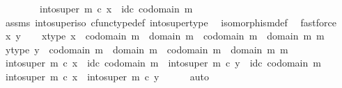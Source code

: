 \begin{isabellebody}
\ \ \ \ \ \ \ \ into{\isacharunderscore}{\kern0pt}super\ m\ {\isasymcirc}\isactrlsub c\ x\ {\isacharequal}{\kern0pt}\ id\isactrlsub c\ {\isacharparenleft}{\kern0pt}codomain\ m{\isacharparenright}{\kern0pt}{\isachardoublequoteclose}\isanewline
\ \ \ \ \isamarkupfalse%
\ assms\ into{\isacharunderscore}{\kern0pt}super{\isacharunderscore}{\kern0pt}iso\ cfunc{\isacharunderscore}{\kern0pt}type{\isacharunderscore}{\kern0pt}def\ into{\isacharunderscore}{\kern0pt}super{\isacharunderscore}{\kern0pt}type\ \isamarkupfalse%
\ isomorphism{\isacharunderscore}{\kern0pt}def\ \isamarkupfalse%
\ fastforce\isanewline
{}\isamarkupfalse%
\isanewline
\ \ \isamarkupfalse%
\ x\ y\isanewline
\ \ \isamarkupfalse%
\ x{\isacharunderscore}{\kern0pt}type{\isacharcolon}{\kern0pt}\ {\isachardoublequoteopen}x\ {\isacharcolon}{\kern0pt}\ codomain\ m\ {\isasymrightarrow}\ domain\ m\ {\isasymCoprod}\ {\isacharparenleft}{\kern0pt}codomain\ m\ {\isasymsetminus}\ {\isacharparenleft}{\kern0pt}domain\ m{\isacharcomma}{\kern0pt}\ m{\isacharparenright}{\kern0pt}{\isacharparenright}{\kern0pt}{\isachardoublequoteclose}\isanewline
\ \ \isamarkupfalse%
\ y{\isacharunderscore}{\kern0pt}type{\isacharcolon}{\kern0pt}\ {\isachardoublequoteopen}y\ {\isacharcolon}{\kern0pt}\ codomain\ m\ {\isasymrightarrow}\ domain\ m\ {\isasymCoprod}\ {\isacharparenleft}{\kern0pt}codomain\ m\ {\isasymsetminus}\ {\isacharparenleft}{\kern0pt}domain\ m{\isacharcomma}{\kern0pt}\ m{\isacharparenright}{\kern0pt}{\isacharparenright}{\kern0pt}{\isachardoublequoteclose}\isanewline
\ \ \isamarkupfalse%
\ {\isachardoublequoteopen}into{\isacharunderscore}{\kern0pt}super\ m\ {\isasymcirc}\isactrlsub c\ x\ {\isacharequal}{\kern0pt}\ id\isactrlsub c\ {\isacharparenleft}{\kern0pt}codomain\ m{\isacharparenright}{\kern0pt}{\isachardoublequoteclose}\ \ {\isachardoublequoteopen}into{\isacharunderscore}{\kern0pt}super\ m\ {\isasymcirc}\isactrlsub c\ y\ {\isacharequal}{\kern0pt}\ id\isactrlsub c\ {\isacharparenleft}{\kern0pt}codomain\ m{\isacharparenright}{\kern0pt}{\isachardoublequoteclose}\isanewline
\ \ \isamarkupfalse%
\ \isamarkupfalse%
\ {\isachardoublequoteopen}into{\isacharunderscore}{\kern0pt}super\ m\ {\isasymcirc}\isactrlsub c\ x\ {\isacharequal}{\kern0pt}\ into{\isacharunderscore}{\kern0pt}super\ m\ {\isasymcirc}\isactrlsub c\ y{\isachardoublequoteclose}\isanewline
\ \ \ \ \isamarkupfalse%
\ auto\isanewline
\ \ \isamarkupfalse%

\end{isabellebody}
